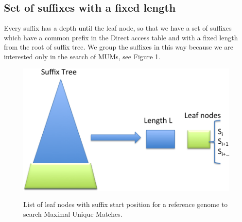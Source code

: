 \documentclass[runningheads,a4paper]{llncs}
\begin{document}
{\subsection{Set of suffixes with a fixed length}
Every suffix has a depth until the leaf node, so that we have a set of suffixes which have a common prefix in the Direct access table and with a fixed length from the root of suffix tree. We group the suffixes in this way because we are interested only in the search of MUMs, see Figure \ref{fig:suffixes}.
\begin{figure}
\centering
\includegraphics[scale=0.5]{Leaf.png}
\label{fig:suffixes}
\caption{List of leaf nodes with suffix start position for a reference genome to search Maximal Unique Matches.}
\end{figure}
}
\end{document}
